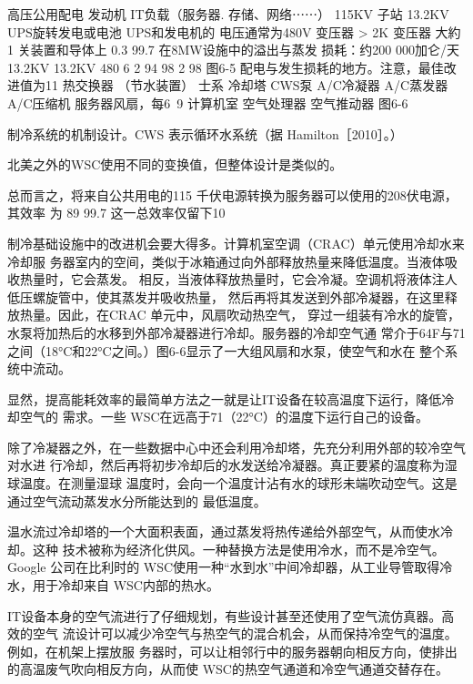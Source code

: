 高压公用配电
发动机
IT负载（服务器.
存储、网络⋯⋯）
115KV
子站
13.2KV
UPS旋转发电或电池
UPS和发电机的
电压通常为480V
变压器
>
2K
变压器
大約1%
关装置和导体上
0.3%
99.7%
在8MW设施中的溢出与蒸发
损耗：约200 000加仑/天
13.2KV
13.2KV
480
6%
2%
94%
98%
2%
98%
图6-5 配电与发生损耗的地方。注意，最佳改进值为11%
热交换器
（节水装置）
士系
冷却塔
CWS泵
A/C冷凝器
A/C蒸发器
A/C压缩机
服务器风扇，每6~9
计算机室
空气处理器
空气推动器
图6-6

制冷系统的机制设计。CWS 表示循环水系统（据 Hamilton［2010］。）

北美之外的WSC使用不同的变换值，但整体设计是类似的。

总而言之，将来自公共用电的115 千伏电源转换为服务器可以使用的208伏电源，其效率
为 89%
99.7%
这一总效率仅留下10%

制冷基础设施中的改进机会要大得多。计算机室空调（CRAC）单元使用冷却水来冷却服
务器室内的空间，类似于冰箱通过向外部释放热量来降低温度。当液体吸收热量时，它会蒸发。
相反，当液体释放热量时，它会冷凝。空调机将液体注人低压螺旋管中，使其蒸发并吸收热量，
然后再将其发送到外部冷凝器，在这里释放热量。因此，在CRAC 单元中，风扇吹动热空气，
穿过一组装有冷水的旋管，水泵将加热后的水移到外部冷凝器进行冷却。服务器的冷却空气通
常介于64F与71之间（18°C和22°C之间。）图6-6显示了一大组风扇和水泵，使空气和水在
整个系统中流动。

显然，提高能耗效率的最简单方法之一就是让IT设备在较高温度下运行，降低冷却空气的
需求。一些 WSC在远高于71（22°C）的温度下运行自己的设备。

除了冷凝器之外，在一些数据中心中还会利用冷却塔，先充分利用外部的较冷空气对水进
行冷却，然后再将初步冷却后的水发送给冷凝器。真正要紧的温度称为湿球温度。在测量湿球
温度时，会向一个温度计沾有水的球形未端吹动空气。这是通过空气流动蒸发水分所能达到的
最低温度。

温水流过冷却塔的一个大面积表面，通过蒸发将热传递给外部空气，从而使水冷却。这种
技术被称为经济化供风。一种替换方法是使用冷水，而不是冷空气。Google 公司在比利时的
WSC使用一种“水到水”中间冷却器，从工业导管取得冷水，用于冷却来自 WSC内部的热水。

IT设备本身的空气流进行了仔细规划，有些设计甚至还使用了空气流仿真器。高效的空气
流设计可以减少冷空气与热空气的混合机会，从而保持冷空气的温度。例如，在机架上摆放服
务器时，可以让相邻行中的服务器朝向相反方向，使排出的高温废气吹向相反方向，从而使
WSC的热空气通道和冷空气通道交替存在。

